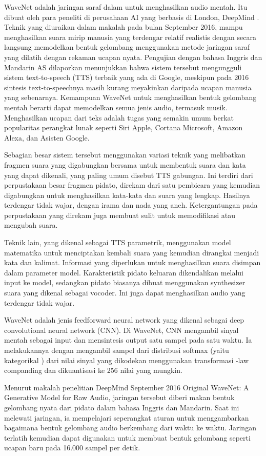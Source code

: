 WaveNet adalah jaringan saraf dalam untuk menghasilkan audio mentah. Itu dibuat oleh para peneliti di perusahaan AI yang berbasis di London, DeepMind . Teknik yang diuraikan dalam makalah pada bulan September 2016, mampu menghasilkan suara mirip manusia yang terdengar relatif realistis dengan secara langsung memodelkan bentuk gelombang menggunakan metode jaringan saraf yang dilatih dengan rekaman ucapan nyata. Pengujian dengan bahasa Inggris dan Mandarin AS dilaporkan menunjukkan bahwa sistem tersebut mengungguli sistem text-to-speech (TTS) terbaik yang ada di Google, meskipun pada 2016 sintesis text-to-speechnya masih kurang meyakinkan daripada ucapan manusia yang sebenarnya. Kemampuan WaveNet untuk menghasilkan bentuk gelombang mentah berarti dapat memodelkan semua jenis audio, termasuk musik\cite{DBLP:journals/corr/OordDZSVGKSK16}.
Menghasilkan ucapan dari teks adalah tugas yang semakin umum berkat popularitas perangkat lunak seperti Siri Apple, Cortana Microsoft, Amazon Alexa, dan Asisten Google.

Sebagian besar sistem tersebut menggunakan variasi teknik yang melibatkan fragmen suara yang digabungkan bersama untuk membentuk suara dan kata yang dapat dikenali, yang paling umum disebut TTS gabungan. Ini terdiri dari perpustakaan besar fragmen pidato, direkam dari satu pembicara yang kemudian digabungkan untuk menghasilkan kata-kata dan suara yang lengkap. Hasilnya terdengar tidak wajar, dengan irama dan nada yang aneh. Ketergantungan pada perpustakaan yang direkam juga membuat sulit untuk memodifikasi atau mengubah suara.

Teknik lain, yang dikenal sebagai TTS parametrik, menggunakan model matematika untuk menciptakan kembali suara yang kemudian dirangkai menjadi kata dan kalimat. Informasi yang diperlukan untuk menghasilkan suara disimpan dalam parameter model. Karakteristik pidato keluaran dikendalikan melalui input ke model, sedangkan pidato biasanya dibuat menggunakan synthesizer suara yang dikenal sebagai vocoder. Ini juga dapat menghasilkan audio yang terdengar tidak wajar.

WaveNet adalah jenis feedforward neural network yang dikenal sebagai deep convolutional neural network (CNN). Di WaveNet, CNN mengambil sinyal mentah sebagai input dan mensintesis output satu sampel pada satu waktu. Ia melakukannya dengan mengambil sampel dari distribusi softmax (yaitu kategorikal ) dari nilai sinyal yang dikodekan menggunakan transformasi -law companding dan dikuantisasi ke 256 nilai yang mungkin.

Menurut makalah penelitian DeepMind September 2016 Original WaveNet: A Generative Model for Raw Audio, jaringan tersebut diberi makan bentuk gelombang nyata dari pidato dalam bahasa Inggris dan Mandarin. Saat ini melewati jaringan, ia mempelajari seperangkat aturan untuk menggambarkan bagaimana bentuk gelombang audio berkembang dari waktu ke waktu. Jaringan terlatih kemudian dapat digunakan untuk membuat bentuk gelombang seperti ucapan baru pada 16.000 sampel per detik\cite{DBLP:journals/corr/OordDZSVGKSK16}.


